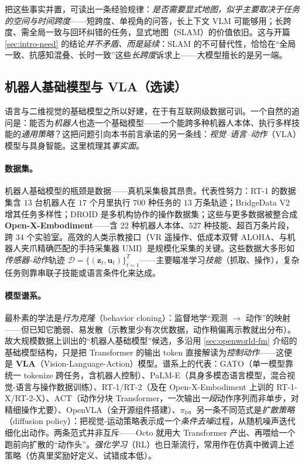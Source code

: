\noindent 把这些事实并置，可读出一条经验规律：\emph{是否需要显式地图，似乎主要取决于任务的空间与时间跨度}——短跨度、单视角的问答，长上下文 VLM 可能够用；长跨度、需全局一致与回环纠错的任务，显式地图（SLAM）的价值依旧。这与开篇 \cref{sec:intro-need} 的结论\emph{并不矛盾、而是延续}：SLAM 的不可替代性，恰恰在“全局一致、抗感知混叠、长时一致”这些\emph{长跨度}诉求上——大模型擅长的是另一端。

\subsection{机器人基础模型与 VLA（选读）}
\label{sec:openworld-vla}

语言与二维视觉的基础模型之所以好建，在于有互联网级数据可训。一个自然的追问是：能否为\emph{机器人}也造一个基础模型——一个能跨多种机器人本体、执行多样技能的\emph{通用策略}？这把问题引向本书前言承诺的另一条线：\emph{视觉–语言–动作}（VLA）模型与具身智能。这里梳理其\emph{事实面}。

\paragraph{数据集。}
机器人基础模型的瓶颈是数据——真机采集极其昂贵。代表性努力\cite{paull2026openworld}：RT-1 的数据集含 $13$ 台机器人在 $17$ 个月里执行 $700$ 种任务的 $13$ 万条轨迹；BridgeData V2 增其任务多样性；DROID 是多机构协作的操作数据集；这些与更多数据被整合成 \textbf{Open-X-Embodiment}——含 $22$ 种机器人本体、$527$ 种技能、超百万条片段，跨 $34$ 个实验室。高效的人类示教接口（VR 遥操作、低成本双臂 ALOHA、与机器人夹爪精确匹配的手持采集器 UMI）是规模化采集的关键。这些数据大多形如\emph{传感器-动作}轨迹 $\mathcal{D}=\{(\mathbf{z}_t,\mathbf{u}_t)\}_{t=1}^{T}$——主要瞄准学习\emph{技能}（抓取、操作），复杂任务则靠串联子技能或语言条件化来达成。

\paragraph{模型谱系。}
最朴素的学法是\emph{行为克隆}（behavior cloning）：监督地学“观测 $\to$ 动作”的映射——但已知它脆弱、易发散（示教里少有次优数据，动作稍偏离示教就出分布）。故大规模数据上训出的“机器人基础模型”候选，多沿用 \cref{sec:openworld-fm} 介绍的基础模型结构，只是把 Transformer 的输出 token 直接解读为\emph{控制动作}——这便是 \textbf{VLA}（Vision-Language-Action）模型\cite{paull2026openworld}。谱系上的代表：GATO（单一模型靠统一 tokenize 跨任务，含机器人控制）、PaLM-E（具身多模态语言模型，混合视觉-语言与操作数据训练）、RT-1/RT-2（及在 Open-X-Embodiment 上训的 RT-1-X/RT-2-X）、ACT（动作分块 Transformer，一次输出\emph{一段}动作序列而非单步，对精细操作尤要）、OpenVLA（全开源组件搭建）、$\pi_0$。另一条不同范式是\emph{扩散策略}（diffusion policy）：把视觉-运动策略表示成一个\emph{条件去噪}过程，从随机噪声迭代细化出动作。两条范式并非互斥——Octo 就用大 Transformer 产出、再喂给一个跑前向扩散的“动作头”。\emph{强化学习}（RL）也日渐流行，常用作在仿真中微调上述策略（仿真里奖励好定义、试错成本低）。

